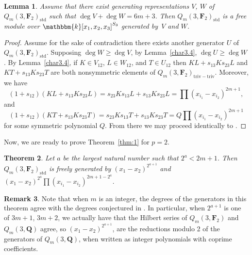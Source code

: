 \documentclass[11pt]{article}
\numberwithin{equation}{section}
\newtheorem{Theorem}{Theorem}[section]
\newtheorem{Lemma}[Theorem]{Lemma}
\theoremstyle{definition}
\newtheorem{Remark}[Theorem]{Remark}
\numberwithin{equation}{section}
\renewcommand{\k}{\mathbbm{k}}
\newcommand{\F}{\mathbf{F}}
\newcommand{\std}{\mathrm{std}}
\newcommand{\trtr}{\mathrm{triv-triv}}
\begin{document}
\begin{Lemma}\label{charFree}
 Assume that there exist generating representations $V$, $W$ of $Q_m(3,\mathbf{F}_2)_\std$ such that $\deg V+\deg W=6m+3$. Then $Q_m(3,\mathbf{F}_2)_\std$ is a free module over $\k[x_1,x_2,x_3]^{S_3}$ generated by~$V$ and $W$.
\end{Lemma}
\begin{proof}
 Assume for the sake of contradiction there exists another generator $U$ of $Q_m(3,\mathbf{F}_2)_{\std}$. Supposing $\deg W\geq \deg V$, by Lemma~\ref{char3.4}, $\deg U\geq \deg W$. By Lemma~\ref{char3.4}, if $K\in V_{12}$, $L\in W_{12}$, and $T\in U_{12}$ then $KL+s_{13}Ks_{23}L$ and $KT+s_{13}Ks_{23}T$ are both nonsymmetric elements of $Q_m(3,\mathbf{F}_2)_{\trtr}$. Moreover, we have
 \[(1+s_{12})(KL+s_{13}Ks_{23}L) = s_{23}Ks_{13}L+s_{13}Ks_{23}L = \prod (x_{i_1}-x_{i_2})^{2m+1},\]
 and
 \[(1+s_{12})(KT+s_{13}Ks_{23}T) = s_{23}Ks_{13}T+s_{13}Ks_{23}T = Q\prod (x_{i_1}-x_{i_2})^{2m+1}\]
 for some symmetric polynomial $Q$. From there we may proceed identically to \cite{wang2022explicit}.
\end{proof}

Now, we are ready to prove Theorem~\ref{thm:1} for $p=2$.

\begin{Theorem}\label{thm:p2}
 Let $a$ be the largest natural number such that $2^a< 2m+1$. Then $Q_m(3,\mathbf{F}_2)_{\std}$ is freely generated by $(x_1-x_2)^{2^{a+1}}$ and $(x_1-x_2)^{2^a}\prod (x_{i_1}-x_{i_2})^{2m+1-2^a}$.
\end{Theorem}

\begin{Remark}
 Note that when $m$ is an integer, the degrees of the generators in this theorem agree with the degrees conjectured in \cite{Ren_2020}. In particular, when $2^{a+1}$ is one of $3m+1$, ${3m+2}$, we actually have that the Hilbert series of $Q_m(3,\F_2)$ and $Q_m(3,\mathbf{Q})$ agree, so $(x_1-x_2)^{2^{a+1}}$,  are the reductions modulo 2 of the generators of $Q_m(3,\mathbf{Q})$, when written as integer polynomials with coprime coefficients.
\end{Remark}
\end{document}
